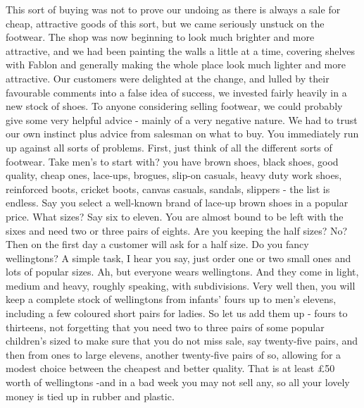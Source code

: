 This sort of buying was not to prove our undoing as there is always a sale for cheap, attractive goods of this sort, but we came seriously unstuck on the footwear. The shop was now beginning to look much brighter and more attractive, and we had been painting the walls a little at a time, covering shelves with Fablon and generally making the whole place look much lighter and more attractive. Our customers were delighted at the change, and lulled by their favourable comments into a false idea of success, we invested fairly heavily in a new stock of shoes. To anyone considering selling footwear, we could probably give some very helpful advice - mainly of a very negative nature. We had to trust our own instinct plus advice from salesman on what to buy. You immediately run up against all sorts of problems. First, just think of all the different sorts of footwear. Take men's to start with? you have brown shoes, black shoes, good quality, cheap ones, lace-ups, brogues, slip-on casuals, heavy duty work shoes, reinforced boots, cricket boots, canvas casuals, sandals, slippers - the list is endless. Say you select a well-known brand of lace-up brown shoes in a popular price. What sizes? Say six to eleven. You are almost bound to be left with the sixes and need two or three pairs of eights. Are you keeping the half sizes? No? Then on the first day a customer will ask for a half size. Do you fancy wellingtons? A simple task, I hear you say, just order one or two small ones and lots of popular sizes. Ah, but everyone wears wellingtons. And they come in light, medium and heavy, roughly speaking, with subdivisions. Very well then, you will keep a complete stock of wellingtons from infants' fours up to men's elevens, including a few coloured short pairs for ladies. So let us add them up - fours to thirteens, not forgetting that you need two to three pairs of some popular children's sized to make sure that you do not miss sale, say twenty-five pairs, and then from ones to large elevens, another twenty-five pairs of so, allowing for a modest choice between the cheapest and better quality. That is at least £50 worth of wellingtons -and in a bad week you may not sell any, so all your lovely money is tied up in rubber and plastic.

